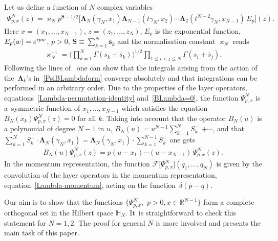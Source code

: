 \documentclass[11pt]{article}
\numberwithin{equation}{section}
\numberwithin{equation}{section}
\begin{document}
 Let us define a function of $N$ complex variables %
\begin{gather}\label{PsiBLambdaform}
\Psi^N_{p,{x}}(z)=\varkappa_N p^{\boldsymbol S-1/2}
 \big[
 \boldsymbol\Lambda_N\left(\gamma_N, x_1\right)
 \boldsymbol\Lambda_{N-1}\left(t\gamma_N, x_2\right)\cdots \boldsymbol\Lambda_2\left(t^{N-2}\gamma_N, x_{N-1}\right) \, E_p\big](z).
\end{gather}
Here $ x=(x_1,\dots,x_{N-1})$, $z=(z_1,\dots, z_N)$, $E_p$ is the exponential function,
$E_p(w)={\rm e}^{{\rm i}pw}$, $p>0$, $\boldsymbol
S\equiv\sum_{k=1}^N \boldsymbol s_k$ and the normalisation constant $\varkappa_N$ reads
\begin{gather*}
\varkappa_N^{-1}=\Bigg(\prod_{k=1}^N\Gamma(s_k+\bar s_k)\Bigg)^{1/2} \prod_{1\leq i<j\leq N}\Gamma(s_i+\bar s_j).
\end{gather*}
Following the lines of~\cite{Kozlowski:2014jka} one can show that the integrals arising from the action of the~$\boldsymbol\Lambda_k$'s in~\eqref{PsiBLambdaform} converge absolutely and that integrations can be performed in an arbitrary order. Due
to the properties of the layer operators, equations~\eqref{Lambda-permutation-identity} and~\eqref{BLambda=0}, the function $ \Psi^N_{p,{x}}$
is a~sym\-met\-ric function of $x_1,\dots, x_{N-1}$ which satisfies the equation $B_N(x_k)\Psi^N_{p,{x}}({z})=0$ for all $k$. Taking into
account that the operator $B_N(u)$ is a polynomial of degree $N-1$ in $u$, $B_N(u)= u^{N-1} \sum_{k=1}^{N} S^-_k$ $+\cdots$, and that
$\sum_{k=1}^{N} S^-_k \cdot \boldsymbol\Lambda_N(\gamma_N, x_1) = \boldsymbol\Lambda_N(\gamma_N, x_1) \cdot \sum_{k=1}^{N-1} S^-_k$
one gets
\begin{gather*}
B_N(u) \Psi^N_{p,{x}}({z})=p(u-x_1)\cdots (u-x_{N-1})\,\Psi^N_{p,{x}}({z}).
\end{gather*}
In the momentum representation, the function $ \mathcal{F}\big[\Psi^N_{p,{x}}\big](q_1,\dots,q_N)$ is given by the convolution of the
layer operators in the momentum representation, equation~\eqref{Lambda-momentum}, acting on the func\-tion~$\delta(p-q)$.

Our aim is to show that the functions $\big\{\Psi^N_{p,{x}},\,\, p>0, {x}\in \mathbb R^{N-1}\big\}$ form a complete orthogonal set in the
Hilbert space $\mathbb H_N$. It~is straightforward to check this statement for $N=1,2$. The proof for general $N$ is more involved and
presents the main task of this paper.
\end{document}
